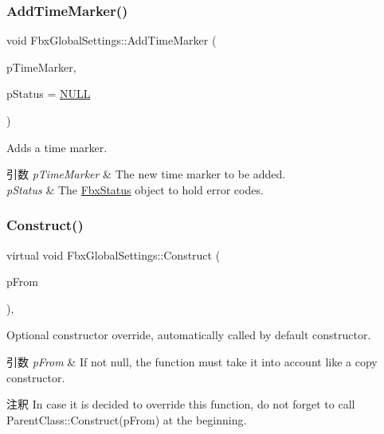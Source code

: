 \subsubsection{\texorpdfstring{Add\+Time\+Marker()}{AddTimeMarker()}}
{\footnotesize\ttfamily void Fbx\+Global\+Settings\+::\+Add\+Time\+Marker (\begin{DoxyParamCaption}\item[{const \hyperlink{struct_fbx_global_settings_1_1_time_marker}{Time\+Marker} \&}]{p\+Time\+Marker,  }\item[{\hyperlink{class_fbx_status}{Fbx\+Status} $\ast$}]{p\+Status = {\ttfamily \hyperlink{fbxarch_8h_a070d2ce7b6bb7e5c05602aa8c308d0c4}{N\+U\+LL}} }\end{DoxyParamCaption})}

Adds a time marker. 
\begin{DoxyParams}{引数}
{\em p\+Time\+Marker} & The new time marker to be added. \\
\hline
{\em p\+Status} & The \hyperlink{class_fbx_status}{Fbx\+Status} object to hold error codes. \\
\hline
\end{DoxyParams}
\mbox{\label{class_fbx_global_settings_a81b462c1a0102da73f5d3678ed85d7c9}} 
\subsubsection{\texorpdfstring{Construct()}{Construct()}}
{\footnotesize\ttfamily virtual void Fbx\+Global\+Settings\+::\+Construct (\begin{DoxyParamCaption}\item[{const \hyperlink{class_fbx_object}{Fbx\+Object} $\ast$}]{p\+From }\end{DoxyParamCaption})\hspace{0.3cm}{\ttfamily [protected]}, {\ttfamily [virtual]}}

Optional constructor override, automatically called by default constructor. 
\begin{DoxyParams}{引数}
{\em p\+From} & If not null, the function must take it into account like a copy constructor. \\
\hline
\end{DoxyParams}
\begin{DoxyRemark}{注釈}
In case it is decided to override this function, do not forget to call Parent\+Class\+::\+Construct(p\+From) at the beginning. 
\end{DoxyRemark}


